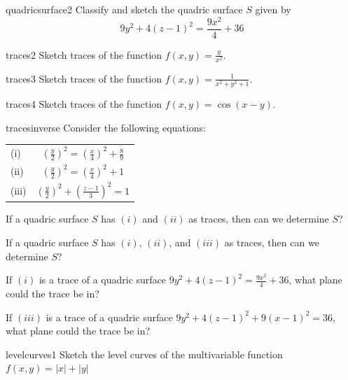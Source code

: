\begin{problem}{quadricsurface2}
Classify and sketch the quadric surface $S$ given by  $$9y^2+4\left(z-1\right)^2 =\frac{9x^2}{4} + 36$$
\end{problem}

\begin{problem}{traces2}
Sketch traces of the function $f(x,y) = \frac{y}{x^2}$.
\end{problem}

\begin{problem}{traces3}
Sketch traces of the function $f(x,y) = \frac{1}{x^2 + y^2 + 1}$.
\end{problem}

\begin{problem}{traces4}
Sketch traces of the function $f(x,y) = \cos(x-y)$.
\end{problem}

\begin{problem}{tracesinverse}
Consider the following equations:
    \begin{center}
    \def\arraystretch{1.5}
        \begin{tabular}{lc}
(i) & $\left(\frac{y}{2}\right)^2 =\left(\frac{x}{4}\right)^2 + \frac{8}{9}$                                         \\
(ii) & $\left(\frac{y}{2}\right)^2 =\left(\frac{x}{4}\right)^2 + 1$     \\
(iii) & $\left(\frac{y}{2}\right)^2+\left(\frac{z-1}{3}\right)^2 = 1$ 
\end{tabular}
    \end{center}
    
    \begin{subproblems}
    \item If a quadric surface $S$ has $(i)$ and $(ii)$ as traces, then can we determine $S$?
    \item If a quadric surface $S$ has $(i)$, $(ii)$, and $(iii)$ as traces, then can we determine $S$?
    \item If $(i)$ is a trace of a quadric surface $9y^2+4\left(z-1\right)^2 =\frac{9x^2}{4} + 36$, what plane could the trace be in?
    \item If $(iii)$ is a trace of a quadric surface $9y^2 + 4(z-1)^2 + 9(x-1)^2 = 36$, what plane could the trace be in?
    \end{subproblems}
    
\end{problem}


\begin{problem}{levelcurves1}
Sketch the level curves of the multivariable function $f(x,y) = |x| + |y|$
\end{problem}




